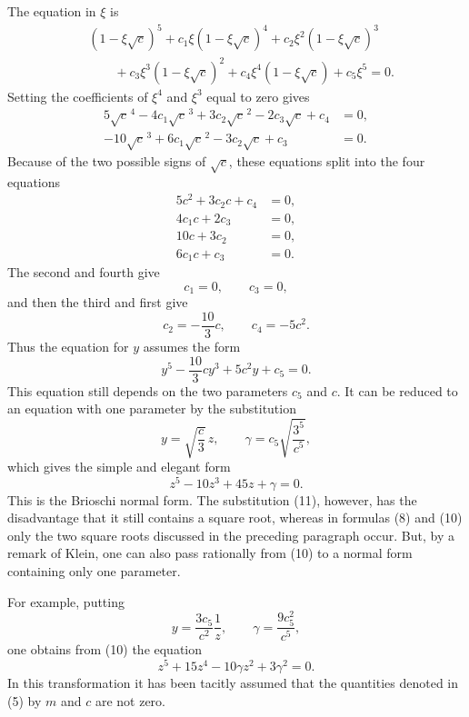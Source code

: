 \documentclass[11pt]{article}
\begin{document}
The equation in $\xi$ is
\[
\begin{aligned}
&(1-\xi\sqrt c)^5+c_1\xi(1-\xi\sqrt c)^4+c_2\xi^2(1-\xi\sqrt c)^3\\
&\qquad +c_3\xi^3(1-\xi\sqrt c)^2+c_4\xi^4(1-\xi\sqrt c)+c_5\xi^5=0.
\end{aligned}
\]
Setting the coefficients of $\xi^4$ and $\xi^3$ equal to zero gives
\[
\begin{aligned}
5\sqrt c^{\,4}-4c_1\sqrt c^{\,3}+3c_2\sqrt c^{\,2}-2c_3\sqrt c+c_4&=0,\\
-10\sqrt c^{\,3}+6c_1\sqrt c^{\,2}-3c_2\sqrt c+c_3&=0.
\end{aligned}
\]
Because of the two possible signs of $\sqrt c$, these equations split into the four equations
\[
\begin{aligned}
5c^2+3c_2c+c_4&=0,\\
4c_1c+2c_3&=0,\\
10c+3c_2&=0,\\
6c_1c+c_3&=0.
\end{aligned}
\]
The second and fourth give
\[
 c_1=0,
 \qquad c_3=0,
\]
and then the third and first give
\[
 c_2=-\frac{10}{3}c,
 \qquad c_4=-5c^2.
\]
Thus the equation for $y$ assumes the form
\begin{equation}
 y^5-\frac{10}{3}cy^3+5c^2y+c_5=0.
\tag{10}
\end{equation}
This equation still depends on the two parameters $c_5$ and $c$. It can be reduced to an equation with one parameter by the substitution
\begin{equation}
 y=\sqrt{\frac c3}\,z,
 \qquad
 \gamma=c_5\sqrt{\frac{3^5}{c^5}},
\tag{11}
\end{equation}
which gives the simple and elegant form
\begin{equation}
 z^5-10z^3+45z+\gamma=0.
\tag{12}
\end{equation}
This is the Brioschi normal form. The substitution (11), however, has the disadvantage that it still contains a square root, whereas in formulas (8) and (10) only the two square roots discussed in the preceding paragraph occur. But, by a remark of Klein, one can also pass rationally from (10) to a normal form containing only one parameter.

For example, putting
\begin{equation}
 y=\frac{3c_5}{c^2}\frac1z,
 \qquad
 \gamma=\frac{9c_5^2}{c^5},
\tag{13}
\end{equation}
one obtains from (10) the equation
\begin{equation}
 z^5+15z^4-10\gamma z^2+3\gamma^2=0.
\tag{14}
\end{equation}
In this transformation it has been tacitly assumed that the quantities denoted in (5) by $m$ and $c$ are not zero.
\end{document}
